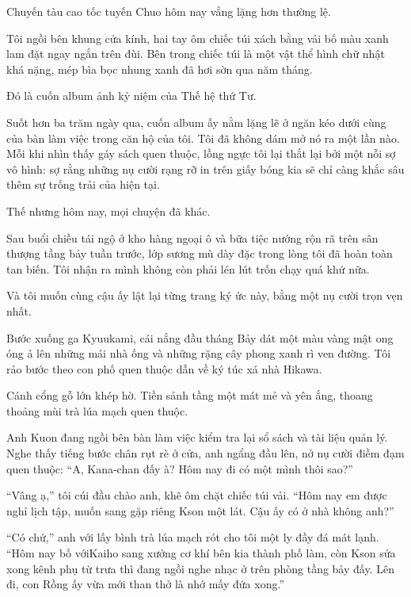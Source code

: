 \documentclass[../main.tex]{subfiles}
\begin{document}

Chuyến tàu cao tốc tuyến Chuo hôm nay vắng lặng hơn thường lệ.

Tôi ngồi bên khung cửa kính, hai tay ôm chiếc túi xách bằng vải bố màu xanh lam đặt ngay ngắn trên đùi. Bên trong chiếc túi là một vật thể hình chữ nhật khá nặng, mép bìa bọc nhung xanh đã hơi sờn qua năm tháng.

Đó là cuốn album ảnh kỷ niệm của Thế hệ thứ Tư.

Suốt hơn ba trăm ngày qua, cuốn album ấy nằm lặng lẽ ở ngăn kéo dưới cùng của bàn làm việc trong căn hộ của tôi. Tôi đã không dám mở nó ra một lần nào. Mỗi khi nhìn thấy gáy sách quen thuộc, lồng ngực tôi lại thắt lại bởi một nỗi sợ vô hình: sợ rằng những nụ cười rạng rỡ in trên giấy bóng kia sẽ chỉ càng khắc sâu thêm sự trống trải của hiện tại.

Thế nhưng hôm nay, mọi chuyện đã khác.

Sau buổi chiều tái ngộ ở kho hàng ngoại ô và bữa tiệc nướng rộn rã trên sân thượng tầng bảy tuần trước, lớp sương mù dày đặc trong lòng tôi đã hoàn toàn tan biến. Tôi nhận ra mình không còn phải lén lút trốn chạy quá khứ nữa.

Và tôi muốn cùng cậu ấy lật lại từng trang ký ức này, bằng một nụ cười trọn vẹn nhất.

\ct

Bước xuống ga Kyuukami, cái nắng đầu tháng Bảy dát một màu vàng mật ong óng ả lên những mái nhà ống và những rặng cây phong xanh rì ven đường. Tôi rảo bước theo con phố quen thuộc dẫn về ký túc xá nhà Hikawa.

Cánh cổng gỗ lớn khép hờ. Tiền sảnh tầng một mát mẻ và yên ắng, thoang thoảng mùi trà lúa mạch quen thuộc.

Anh Kuon đang ngồi bên bàn làm việc kiểm tra lại sổ sách và tài liệu quản lý. Nghe thấy tiếng bước chân rụt rè ở cửa, anh ngẩng đầu lên, nở nụ cười điềm đạm quen thuộc: ``A, Kana-chan đấy à? Hôm nay đi có một mình thôi sao?''

``Vâng ạ,'' tôi cúi đầu chào anh, khẽ ôm chặt chiếc túi vải. ``Hôm nay em được nghỉ lịch tập, muốn sang gặp riêng Kson một lát. Cậu ấy có ở nhà không anh?''

``Có chứ,'' anh với lấy bình trà lúa mạch rót cho tôi một ly đầy đá mát lạnh. ``Hôm nay bố vớiKaiho sang xưởng cơ khí bên kia thành phố làm, còn Kson sửa xong kênh phụ từ trưa thì đang ngồi nghe nhạc ở trên phòng tầng bảy đấy. Lên đi, con Rồng ấy vừa mới than thở là nhớ mấy đứa xong.''
\end{document}
